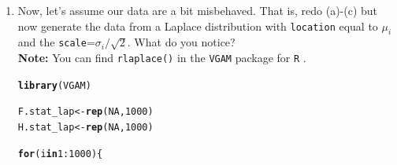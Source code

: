\documentclass{article}\usepackage[]{graphicx}\usepackage[]{xcolor}
\makeatletter
\newcommand{\hlnum}[1]{\textcolor[rgb]{0.686,0.059,0.569}{#1}}%
\newcommand{\hlopt}[1]{\textcolor[rgb]{0,0,0}{#1}}%
\newcommand{\hldef}[1]{\textcolor[rgb]{0.345,0.345,0.345}{#1}}%
\newcommand{\hlkwa}[1]{\textcolor[rgb]{0.161,0.373,0.58}{\textbf{#1}}}%
\newcommand{\hlkwb}[1]{\textcolor[rgb]{0.69,0.353,0.396}{#1}}%
\newcommand{\hlkwd}[1]{\textcolor[rgb]{0.737,0.353,0.396}{\textbf{#1}}}%
\newenvironment{kframe}{%
 \def\at@end@of@kframe{}%
 \ifinner\ifhmode%
  \def\at@end@of@kframe{\end{minipage}}%
  \begin{minipage}{\columnwidth}%
 \fi\fi%
 \def\FrameCommand##1{\hskip\@totalleftmargin \hskip-\fboxsep
 \colorbox{shadecolor}{##1}\hskip-\fboxsep
     \hskip-\linewidth \hskip-\@totalleftmargin \hskip\columnwidth}%
 \MakeFramed {\advance\hsize-\width
   \@totalleftmargin\z@ \linewidth\hsize
   \@setminipage}}%
 {\par\unskip\endMakeFramed%
 \at@end@of@kframe}
\newenvironment{knitrout}{}{} %
\makeatother
\begin{document}
\begin{enumerate}
\begin{enumerate}
\begin{knitrout}\scriptsize
{}\color{fgcolor}\begin{kframe}
\begin{alltt}
\hldef{(power_F} \hlkwb{<-} \hlkwd{mean}\hldef{(F.stat} \hlopt{>=} \hldef{rejection_point_F))}
\end{alltt}
\begin{verbatim}
## [1] 0.2
\end{verbatim}
\begin{alltt}
\hldef{(type2_F} \hlkwb{<-} \hlnum{1} \hlopt{-} \hldef{power_F)}
\end{alltt}
\begin{verbatim}
## [1] 0.8
\end{verbatim}
\begin{alltt}
\hldef{(power_H} \hlkwb{<-} \hlkwd{mean}\hldef{(H.stat} \hlopt{>=} \hldef{rejection_point_H))}
\end{alltt}
\begin{verbatim}
## [1] 0.2
\end{verbatim}
\begin{alltt}
\hldef{(type2_H} \hlkwb{<-} \hlnum{1} \hlopt{-} \hldef{power_H)}
\end{alltt}
\begin{verbatim}
## [1] 0.8
\end{verbatim}
\end{kframe}
\end{knitrout}

\item Now, let's assume our data are a bit misbehaved. That is, redo
(a)-(c) but now generate the data from a Laplace distribution with
\texttt{location} equal to $\mu_i$ and the \texttt{scale}=$\sigma_i/\sqrt{2}$.
What do you notice?\\
\textbf{Note:} You can find \texttt{rlaplace()} in the \texttt{VGAM}
package for \texttt{R} \cite{VGAM}.

\begin{knitrout}\scriptsize
{}\color{fgcolor}\begin{kframe}
\begin{alltt}
\hlkwd{library}\hldef{(VGAM)}

\hldef{F.stat_lap} \hlkwb{<-} \hlkwd{rep}\hldef{(}\hlnum{NA}\hldef{,} \hlnum{1000}\hldef{)}
\hldef{H.stat_lap} \hlkwb{<-} \hlkwd{rep}\hldef{(}\hlnum{NA}\hldef{,} \hlnum{1000}\hldef{)}

\hlkwa{for} \hldef{(i} \hlkwa{in} \hlnum{1}\hlopt{:}\hlnum{1000}\hldef{)\{}


\end{alltt}
\end{kframe}
\end{knitrout}
\end{enumerate}
\end{enumerate}
\end{document}
